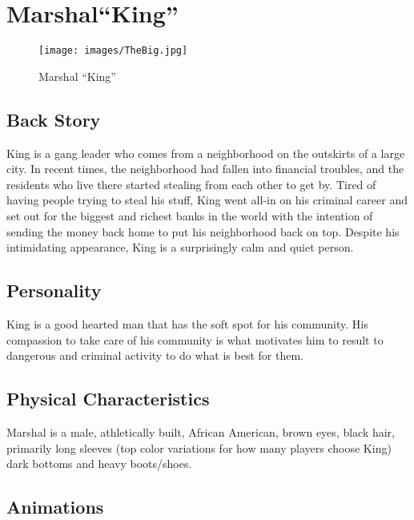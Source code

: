 \documentclass[10pt]{report}
\begin{document}
\section{Marshal``King''}

\begin{multicols}{2}
    \begin{figure}[H]
        \centering
        \texttt{[image: images/TheBig.jpg]}
        \caption{Marshal ``King''}
    \end{figure}
    
    \subsection{Back Story}

    King is a gang leader who comes from a neighborhood on the outskirts of a large city. In recent times, the neighborhood had fallen into financial troubles, and the residents who live there started stealing from each other to get by. Tired of having people trying to steal his stuff, King went all-in on his criminal career and set out for the biggest and richest banks in the world with the intention of sending the money back home to put his neighborhood back on top. Despite his intimidating appearance, King is a surprisingly calm and quiet person. 
    
    \subsection{Personality}
    
    King is a good hearted man that has the soft spot for his community. His compassion to take care of his community is what motivates him to result to dangerous and criminal activity to do what is best for them.
    
    \subsection{Physical Characteristics}
    
    Marshal is a male, athletically built, African American, brown eyes, black hair, primarily long sleeves (top color variations for how many players choose King) dark bottoms and heavy boots/shoes.
    
    \subsection{Animations}
    

\end{multicols}
\end{document}
